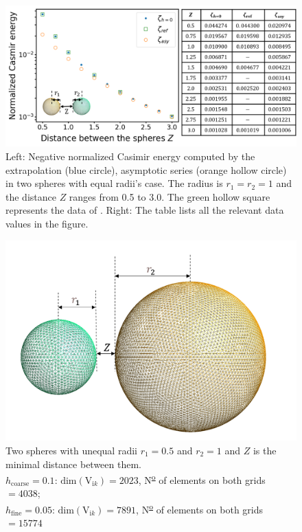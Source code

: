 \begin{figure}[H]
    \centering
    \includegraphics[width = \textwidth]{figures/Scalar_sp_equal_CasE.png}
    \caption[Caption for LOF]{{\color{gray}Left:} Negative normalized Casimir energy  \protect\footnotemark computed by the extrapolation (blue circle), asymptotic series (orange hollow circle) in two spheres with equal radii's case. The radius is $r_{1} = r_{2} = 1$ and the distance $Z$ 
    ranges from 0.5 to 3.0. The green hollow square represents the data of \cite{kenneth2008casimir}. {\color{gray}Right:} The table lists all the relevant data values in the figure.}
    \label{Casimir energy between spheres with equal radii}
\end{figure}

\begin{figure}[H]
    \centering
    \includegraphics[scale = 0.5]{figures/Sphere_unequal_radii.png}
    \caption{Two spheres with unequal radii $r_{1} = 0.5$ and $r_{2} = 1$ and $Z$ is the minimal distance between them.\\
    \hspace*{1.5cm}$h_{\text{coarse}} = 0.1$: $\text{dim}(\mathrm{V}_{\mathrm{i}k}) = 2023$,  N\textsuperscript{\underline{o}} of elements on both grids $ = 4038$;\\
    \hspace*{1.5cm}$h_{\text{fine}} = 0.05$: $\text{dim}(\mathrm{V}_{\mathrm{i}k}) = 7891$,  N\textsuperscript{\underline{o}} of elements on both grids $ = 15774$}
    \label{Two spheres with unequal radii}
\end{figure}


